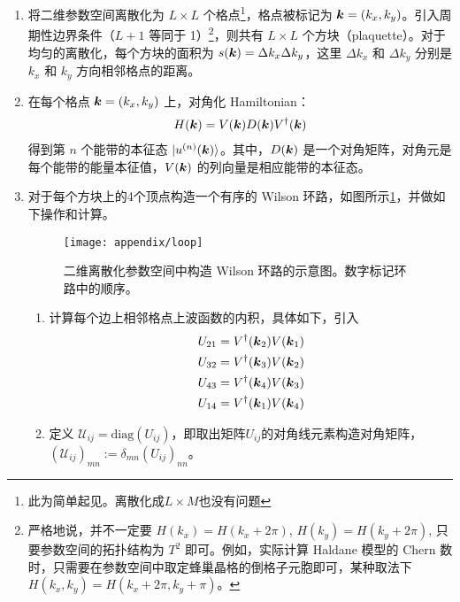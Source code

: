 \begin{enumerate}

\item 将二维参数空间离散化为 $L\times L$ 个格点\footnote{此为简单起见。离散化成$L\times M$也没有问题}，格点被标记为 $\boldsymbol{k}=(k_x, k_y)$。引入周期性边界条件（$L+1$ 等同于 1）\footnote{严格地说，并不一定要 $H(k_x)=H(k_x+2\pi)$, $H(k_y)=H(k_y+2\pi)$, 只要参数空间的拓扑结构为 $T^2$ 即可。例如，实际计算 Haldane 模型的 Chern 数时，只需要在参数空间中取定蜂巢晶格的倒格子元胞即可，某种取法下 $H(k_x, k_y) = H(k_x + 2\pi, k_y + \pi)$。}，则共有 $L\times L$ 个方块（plaquette）。对于均匀的离散化，每个方块的面积为 $s(\boldsymbol{k})=\Delta k_x\Delta k_y$，这里 $\Delta k_x$ 和 $\Delta k_y$ 分别是 $k_x$ 和 $k_y$ 方向相邻格点的距离。

\item 在每个格点 $\boldsymbol{k}=(k_x, k_y)$ 上，对角化 Hamiltonian：
\begin{align}
H(\boldsymbol{k}) = V(\boldsymbol{k})D(\boldsymbol{k})V^{\dagger}(\boldsymbol{k})
\end{align}
得到第 $n$ 个能带的本征态 $|u^{(n)}(\boldsymbol{k})\rangle$。其中，$D(\boldsymbol{k})$ 是一个对角矩阵，对角元是每个能带的能量本征值，$V(\boldsymbol{k})$ 的列向量是相应能带的本征态。

\item 对于每个方块上的4个顶点构造一个有序的 Wilson 环路，如图所示\ref{fig:topoml-appendix}，并做如下操作和计算。
\begin{figure}
\centering
\texttt{[image: appendix/loop]}
\caption{二维离散化参数空间中构造 Wilson 环路的示意图。数字标记环路中的顺序。}\label{fig:topoml-appendix}
\end{figure}

\begin{enumerate}

\item 计算每个边上相邻格点上波函数的内积，具体如下，引入
\begin{align}
U_{21} &= V^{\dagger}(\boldsymbol{k}_2) V(\boldsymbol{k}_1) \\ 
U_{32} &= V^{\dagger}(\boldsymbol{k}_3) V(\boldsymbol{k}_2) \\ 
U_{43} &= V^{\dagger}(\boldsymbol{k}_4) V(\boldsymbol{k}_3) \\ 
U_{14} &= V^{\dagger}(\boldsymbol{k}_1) V(\boldsymbol{k}_4) 
\end{align}

\item 定义 $\mathcal{U}_{ij} = \text{diag}(U_{ij})$，即取出矩阵$U_{ij}$的对角线元素构造对角矩阵，$(\mathcal{U}_{ij})_{mn}:=\delta_{mn}(U_{ij})_{nn}$。


\end{enumerate}
\end{enumerate}
